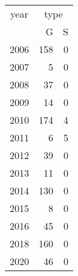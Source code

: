 \footnotesize\begin{tabular}[t]{lrr}
\toprule
\multicolumn{1}{c}{year} & \multicolumn{2}{c}{type} \\
\cmidrule(l{3pt}r{3pt}){1-1} \cmidrule(l{3pt}r{3pt}){2-3}
  & G & S\\
\midrule
2006 & 158 & 0\\
2007 & 5 & 0\\
2008 & 37 & 0\\
2009 & 14 & 0\\
2010 & 174 & 4\\
2011 & 6 & 5\\
2012 & 39 & 0\\
2013 & 11 & 0\\
2014 & 130 & 0\\
2015 & 8 & 0\\
2016 & 45 & 0\\
2018 & 160 & 0\\
2020 & 46 & 0\\
\bottomrule
\end{tabular}
